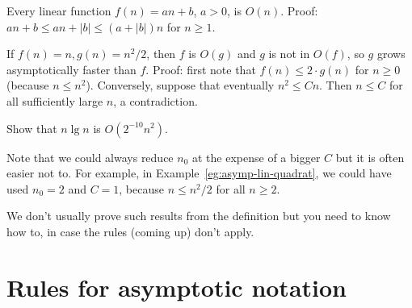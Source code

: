 \begin{Boxample}
Every linear function $f(n) = an + b$, $a > 0$, is $O(n)$. Proof: 
$an + b \leq an + |b| \leq (a + |b|) n$ for $n \geq 1$. 
\end{Boxample}

\begin{Boxample} 
\label{eg:asymp-lin-quadrat}
If $f(n) = n, g(n) = n^2/2$, then $f$ is $O(g)$ and $g$ is not
in $O(f)$, so $g$ grows asymptotically faster than $f$. Proof: 
first note that $f(n) \leq 2 \cdot g(n)$ for $n\geq 0$ (because $n\leq n^2$). Conversely, suppose 
that eventually $n^2 \leq Cn$. Then $n \leq C$ for all sufficiently large $n$, 
a contradiction.
\end{Boxample}

\begin{Boxample}[4]
Show that $n \lg n$ is $O(2^{-10} n^2)$.
\end{Boxample}

Note that we could always reduce $n_0$ at the expense of a bigger $C$ but 
it is often easier not to. For example, in Example~\ref{eg:asymp-lin-quadrat}, we could have used 
$n_0 = 2$ and $C = 1$, because $n\leq n^2/2$ for all $n\geq 2$.

We don't usually prove such results from the definition but you
need to know how to, in case the rules (coming up) don't apply.

\section*{Rules for asymptotic notation}

